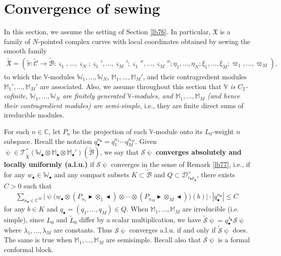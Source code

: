 \documentclass[12pt,a4paper,notitlepage]{report}
\theoremstyle{definition}
\theoremstyle{plain}
\newcommand{\fk}{\mathfrak}
\newcommand{\mc}{\mathcal}
\newcommand{\wtd}{\widetilde}
\newcommand{\scr}{\mathscr}
\newcommand{\sgm}{\varsigma}
\newcommand{\blt}{\bullet}
\newcommand{\Vbb}{\mathbb V}
\newcommand{\Wbb}{\mathbb W}
\newcommand{\Mbb}{\mathbb M}
\newcommand{\Cbb}{\mathbb C}
\newcommand{\btl}{\blacktriangleleft}
\newcommand{\btr}{\blacktriangleright}
\numberwithin{equation}{section}
\begin{document}
\section{Convergence of sewing}\label{lb147}


In this section, we assume the setting of Section \ref{lb76}. In particular, $\fk X$ is a family of $N$-pointed complex curves with local coordinates obtained by sewing the smooth family
\begin{align*}
\wtd{\fk X}=(\wtd\pi:\wtd{\mc C}\rightarrow\wtd{\mc B};\sgm_1,\dots,\sgm_N;\sgm_1',\dots,\sgm_M';\sgm_1'',\dots,\sgm_M'';\eta_1,\dots,\eta_N;\xi_1,\dots,\xi_M;\varpi_1,\dots,\varpi_M),
\end{align*}
to which the $\Vbb$-modules $\Wbb_1,\dots,\Wbb_N$, $\Mbb_1,\dots,\Mbb_M'$, and their contragredient modules $\Mbb_1',\dots,\Mbb_M'$ are associated.  Also, we assume throughout this section that \emph{$\Vbb$ is $C_2$-cofinite,  $\Wbb_1,\dots,\Wbb_N$ are finitely generated $\Vbb$-modules, and $\Mbb_1,\dots,\Mbb_M$ (and hence their contragredient modules) are semi-simple}, i.e., they are finite direct sums of irreducible modules. 


For each $n\in\Cbb$, let $P_n$ be the projection of each $\Vbb$-module onto its $L_0$-weight $n$ subspace. Recall the notation $q_\blt^{n_\blt}=q_1^{n_1}\cdots q_M^{n_M}$. Given $\uppsi\in\scr T_{\wtd{\fk X}}^*(\Wbb_\blt\otimes\Mbb_\blt\otimes\Mbb_\blt')(\wtd{\mc B})$, we say that $\mc S\uppsi$ \textbf{converges absolutely and locally uniformly (a.l.u.)} if $\mc S\uppsi$ converges in the sense of Remark \ref{lb77}, i.e., if for any $w_\blt\in\Wbb_\blt$ and any compact subsets $K\subset\wtd{\mc B}$ and $Q\subset\mc D_{r_\blt\rho_\blt}^\times$, there exists $C>0$ such that
\begin{align*}
\sum_{n_\blt\in\Cbb^M}\Big|\uppsi\Big(w_\blt\otimes (P_{n_1}\btr\otimes_1\btl)\otimes\cdots\otimes (P_{n_M}\btr\otimes_M\btl)\Big)(b)   \Big|\cdot |q_\blt^{n_\blt}|\leq C
\end{align*}
for any $b\in K$ and $q_\blt=(q_1,\dots,q_M)\in Q$. When $\Mbb_1,\dots,\Mbb_M$ are irreducible (i.e. simple), since $L_0$ and $\wtd L_0$ differ by a scalar multiplication, we have $\wtd{\mc S}\uppsi=q_\blt^{\lambda_\blt}\mc S\uppsi$  where $\lambda_1,\dots,\lambda_M$ are constants. Thus $\mc S\uppsi$ converges a.l.u. if and only if $\wtd{\mc S}\uppsi$ does. The same is true when $\Mbb_1,\dots,\Mbb_M$ are semisimple. Recall also that $\mc S\uppsi$ is a formal conformal block.
\end{document}
